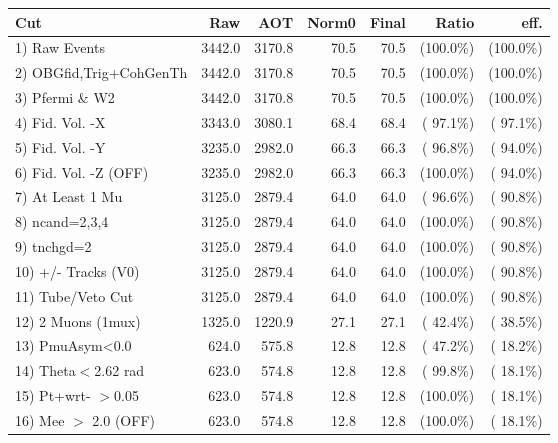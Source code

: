  \begin{table}[h!]\centering
 \begin{tabular}{||l||r|r|r|r|r|r||}
 \hline
 \hline
 Cut & Raw & AOT & Norm0 & Final & Ratio & eff.       \\
 \hline
  1) Raw Events           &       3442.0 &       3170.8 &         70.5 &         70.5 & (100.0\%) & (100.0\%) \\
  2) OBGfid,Trig+CohGenTh &       3442.0 &       3170.8 &         70.5 &         70.5 & (100.0\%) & (100.0\%) \\
  3) Pfermi \& W2         &       3442.0 &       3170.8 &         70.5 &         70.5 & (100.0\%) & (100.0\%) \\
  4) Fid. Vol. -X         &       3343.0 &       3080.1 &         68.4 &         68.4 & ( 97.1\%) & ( 97.1\%) \\
  5) Fid. Vol. -Y         &       3235.0 &       2982.0 &         66.3 &         66.3 & ( 96.8\%) & ( 94.0\%) \\
  6) Fid. Vol. -Z (OFF)   &       3235.0 &       2982.0 &         66.3 &         66.3 & (100.0\%) & ( 94.0\%) \\
  7) At Least 1 Mu        &       3125.0 &       2879.4 &         64.0 &         64.0 & ( 96.6\%) & ( 90.8\%) \\
  8) ncand=2,3,4          &       3125.0 &       2879.4 &         64.0 &         64.0 & (100.0\%) & ( 90.8\%) \\
  9) tnchgd=2             &       3125.0 &       2879.4 &         64.0 &         64.0 & (100.0\%) & ( 90.8\%) \\
 10) +/- Tracks (V0)      &       3125.0 &       2879.4 &         64.0 &         64.0 & (100.0\%) & ( 90.8\%) \\
 11) Tube/Veto Cut        &       3125.0 &       2879.4 &         64.0 &         64.0 & (100.0\%) & ( 90.8\%) \\
 12) 2 Muons (1mux)       &       1325.0 &       1220.9 &         27.1 &         27.1 & ( 42.4\%) & ( 38.5\%) \\
 13) PmuAsym<0.0          &        624.0 &        575.8 &         12.8 &         12.8 & ( 47.2\%) & ( 18.2\%) \\
 14) Theta$<$2.62 rad     &        623.0 &        574.8 &         12.8 &         12.8 & ( 99.8\%) & ( 18.1\%) \\
 15) Pt+wrt- $>$0.05      &        623.0 &        574.8 &         12.8 &         12.8 & (100.0\%) & ( 18.1\%) \\
 16) Mee $>$ 2.0  (OFF)   &        623.0 &        574.8 &         12.8 &         12.8 & (100.0\%) & ( 18.1\%) \\

\end{tabular}
\end{table}
